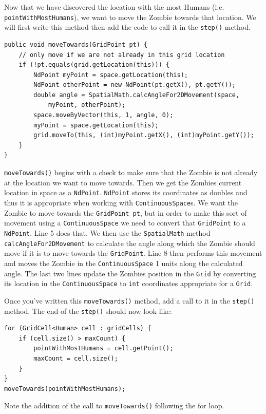 \documentclass[11pt]{amsart}
\begin{document}
Now that we have discovered the location with the most Humans (i.e. \texttt{pointWithMostHumans}), we want to move the Zombie towards that location. We will first write this method then add the code to call it in the \texttt{step()} method.

\noindent\begin{minipage}[h]{\textwidth}
\vspace{.2in}
\lstset{language=java,caption=moveTowards Method}
\begin{lstlisting}
public void moveTowards(GridPoint pt) {
	// only move if we are not already in this grid location
	if (!pt.equals(grid.getLocation(this))) {
		NdPoint myPoint = space.getLocation(this);
		NdPoint otherPoint = new NdPoint(pt.getX(), pt.getY());
		double angle = SpatialMath.calcAngleFor2DMovement(space, 
			myPoint, otherPoint);
		space.moveByVector(this, 1, angle, 0);
		myPoint = space.getLocation(this);
		grid.moveTo(this, (int)myPoint.getX(), (int)myPoint.getY());
	}
}
\end{lstlisting}
\vspace{.2in}
\end{minipage}

\texttt{moveTowards()} begins with a check to make sure that the Zombie is not already at the location we want to move towards. Then we get the Zombies current location in space as a \texttt{NdPoint}. \texttt{NdPoint} stores its coordinates as doubles and thus it is appropriate when working with \texttt{ContinuousSpace}s. We want the Zombie to move towards the \texttt{GridPoint pt}, but in order to make this sort of movement using a \texttt{ContinuousSpace} we need to convert that \texttt{GridPoint} to a \texttt{NdPoint}. Line 5 does that. We then use the \texttt{SpatialMath} method \texttt{calcAngleFor2DMovement} to calculate the angle along which the Zombie should move if it is to move towards the \texttt{GridPoint}. Line 8 then performs this movement and moves the Zombie in the \texttt{ContinuousSpace} 1 units along the calculated angle. The last two lines update the Zombies position in the \texttt{Grid} by converting its location in the \texttt{ContinuousSpace} to \texttt{int} coordinates appropriate for a \texttt{Grid}.

Once you've written this \texttt{moveTowards()} method, add a call to it in the \texttt{step()} method. The end of the \texttt{step()} should now look like:

\noindent\begin{minipage}[h]{\textwidth}
\vspace{.2in}
\lstset{language=java,caption=Step with MoveTowards Added}
\begin{lstlisting}
for (GridCell<Human> cell : gridCells) {
	if (cell.size() > maxCount) {
		pointWithMostHumans = cell.getPoint();
		maxCount = cell.size();
	}
}
moveTowards(pointWithMostHumans);
\end{lstlisting}
\vspace{.2in}
\end{minipage}
Note the addition of the call to \texttt{moveTowards()} following the for loop.
\end{document}
